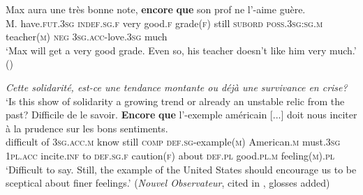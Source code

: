 \begin{exe}
	\ex
	\gll Max aura une très bonne note, \textbf{encore} \textbf{que} son prof ne l'-aime guère.\\
	M. have.\textsc{fut}.3\textsc{sg} \textsc{indef}.\textsc{sg}.\textsc{f} very good.\textsc{f} grade(\textsc{f}) still \textsc{subord} \textsc{poss}.3\textsc{sg}:\textsc{sg}.\textsc{m} teacher(\textsc{m}) \textsc{neg} 3\textsc{sg}.\textsc{acc}-love.3\textsc{sg} much\\
	\glt \lq Max will get a very good grade. Even so, his teacher doesn’t like him very much.\rq{ }(\cite[195]{MosegaardHansen2008})
	
	\ex
	\begin{xlist}
		\textit{Cette solidarité, est-ce une tendance montante ou déjà une survivance en crise?}\\
		\lq Is this show of solidarity a growing trend or already an unstable relic from the past?
		\gll Difficile de le savoir. \textbf{Encore} \textbf{que} l’-exemple américain [...] doit nous inciter à la prudence sur les bons sentiments.\\
		difficult of 3\textsc{sg}.\textsc{acc}.\textsc{m} know still \textsc{comp} \textsc{def}.\textsc{sg}-example(\textsc{m}) American.\textsc{m} {} must.3\textsc{sg} 1\textsc{pl}.\textsc{acc} incite.\textsc{inf} to \textsc{def}.\textsc{sg}.\textsc{f} caution(\textsc{f}) about \textsc{def}.\textsc{pl} good.\textsc{pl}.\textsc{m} feeling(\textsc{m}).\textsc{pl}\\
		\glt \lq Difficult to say. Still, the example of the United States should encourage us to be sceptical about finer feelings.’ (\textit{Nouvel Observateur}, cited in \cite[192]{MosegaardHansen2008}, glosses added)
	\end{xlist}
\end{exe}

